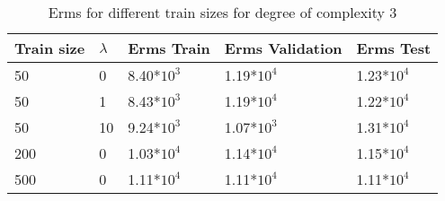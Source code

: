 \def\arraystretch{1.25}
\begin{table}[H]
\centering
\begin{tabular}{l l l l l}
\hline
\hline
\textbf{Train size} & \textbf{$\lambda$} & \textbf{Erms Train} & \textbf{Erms Validation} & \textbf{Erms Test}\\
\hline
\hline
50 & 0 & 8.40*$10^3$ & 1.19*$10^4$ & 1.23*$10^4$  \\
50 & 1 & 8.43*$10^3$ & 1.19*$10^4$ & 1.22*$10^4$ \\
50 & 10 & 9.24*$10^3$ & 1.07*$10^3$ & 1.31*$10^4$ \\
200 & 0 & 1.03*$10^4$ & 1.14*$10^4$ & 1.15*$ 10^4$  \\
500 & 0 & 1.11*$10^4$ & 1.11*$10^4$ & 1.11*$10^4$\\
\hline
\end{tabular}
\caption{Erms for different train sizes for degree of complexity 3}
\end{table}

